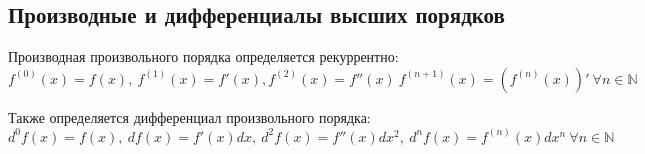 \subsection{Производные и дифференциалы высших порядков}
Производная произвольного порядка определяется рекуррентно:
\begin{equation*}
f^{(0)}(x) = f(x), \ f^{(1)}(x) = f'(x), f^{(2)}(x) = f''(x) \ f^{(n + 1)}(x) = (f^{(n)}(x))' \ \forall n \in \mathbb N
\end{equation*}

Также определяется дифференциал произвольного порядка:
\begin{equation*}
d^0 f(x) = f(x), \ df(x) = f'(x)dx, \ d^2 f(x) = f''(x) dx^2, \ d^n f(x) = f^{(n)}(x) dx^n \ \forall n \in \mathbb N
\end{equation*}
